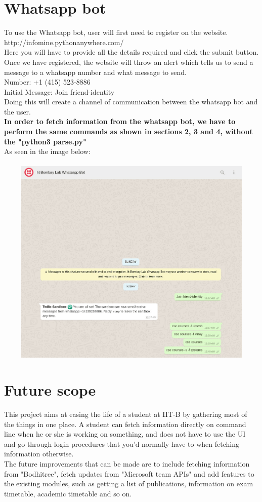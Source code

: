 \documentclass[12pt, letterpaper, twoside]{article}
\begin{document}
\section{Whatsapp bot}

To use the Whatsapp bot, user will first need to register on the website.\\
http://infomine.pythonanywhere.com/ \\
Here you will have to provide all the details required and click the submit button. Once we have registered, the website will throw an alert which tells us to send a message to a whatsapp number and what message to send.\\
Number: +1 (415) 523-8886 \\
Initial Message: Join friend-identity \\
Doing this will create a channel of communication between the whatsapp bot and the user. \\
\textbf{In order to fetch information from the whatsapp bot, we have to perform the same commands as shown in sections 2, 3 and 4, without the "python3 parse.py"}\\
As seen in the image below: \\
\\
\includegraphics[width=14cm, height=10cm]{Latex_Image}

\section{Future scope}
This project aims at easing the life of a student at IIT-B by gathering most of the things in one place. A student can fetch information directly on command line when he or she is working on something, and does not have to use the UI and go through login procedures that you'd normally have to when fetching information otherwise.\\
The future improvements that can be made are to include fetching information from "Bodhitree", fetch updates from "Microsoft team APIs" and add features to the existing modules, such as getting a list of publications, information on exam timetable, academic timetable and so on.
\end{document}
